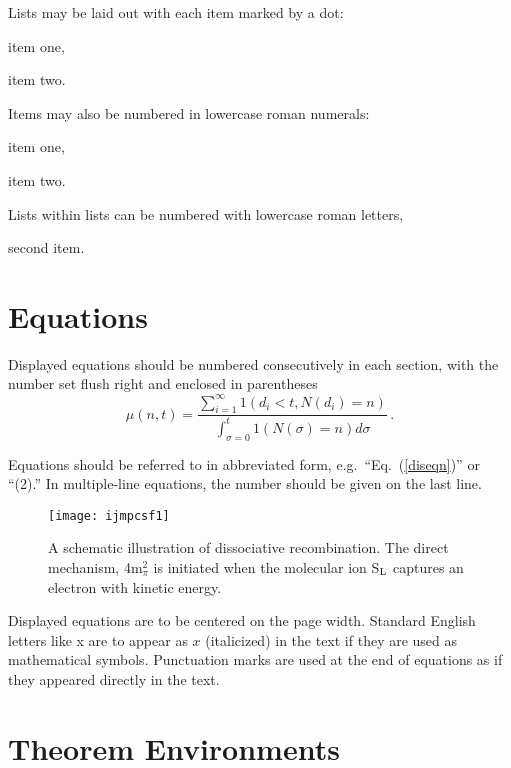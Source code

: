 \documentclass{ws-ijmpcs}
\begin{document}
Lists may be laid out with each item marked by a dot:
\begin{itemlist}
 \item item one,
 \item item two.
\end{itemlist}
Items may also be numbered in lowercase roman numerals:
\begin{romanlist}[(ii)]
\item item one,
\item item two.
	\begin{romanlist}[(b)]
	\item Lists within lists can be numbered with lowercase
              roman letters,
	\item second item.
	\end{romanlist}
\end{romanlist}

\section{Equations}

Displayed equations should be numbered consecutively in each
section, with the number set flush right and enclosed in
parentheses
\begin{equation}
\mu(n,t)=\frac{\sum^\infty_{i=1} 1(d_i < t, N(d_i)= n)}{\int^t_{\sigma=0} 1(N(\sigma) = n)d\sigma}\,.
\label{diseqn}
\end{equation}

Equations should be referred to in abbreviated form,
e.g.~``Eq.~(\ref{diseqn})'' or ``(2).'' In multiple-line
equations, the number should be given on the last line.

\begin{figure}[pb]
\centerline{\texttt{[image: ijmpcsf1]}}
\vspace*{8pt}
\caption{A schematic illustration of dissociative recombination. The
direct mechanism, 4m$^2_\pi$ is initiated when the
molecular ion S$_{\rm L}$ captures an electron with
kinetic energy. \label{f1}}
\end{figure}

Displayed equations are to be centered on the page width.
Standard English letters like x are to appear as $x$
(italicized) in the text if they are used as mathematical
symbols. Punctuation marks are used at the end of equations as
if they appeared directly in the text.

\section{Theorem Environments}
\end{document}
